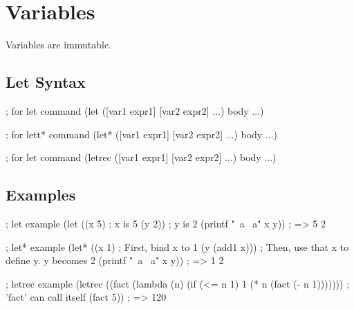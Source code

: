 \section{Variables}

Variables are immutable.

\subsection{Let Syntax}

\begin{racketcode}
; for let command
(let ([var1 expr1] [var2 expr2] ...) body ...)

; for lett* command
(let* ([var1 expr1] [var2 expr2] ...) body ...)

; for let command
(letrec ([var1 expr1] [var2 expr2] ...) body ...)
\end{racketcode}

\subsection{Examples}

\begin{racketcode}
; let example
(let ((x 5)      ; x is 5
      (y 2))     ; y is 2
  (printf "~a ~a\n" x y)) ; => 5 2

; let* example
(let* ((x 1)           ; First, bind x to 1
       (y (add1 x)))   ; Then, use that x to define y. y becomes 2
  (printf "~a ~a\n" x y)) ; => 1 2

; letrec example
(letrec ((fact (lambda (n)
                 (if (<= n 1)
                     1
                     (* n (fact (- n 1))))))) ; 'fact' can call itself
  (fact 5)) ; => 120
\end{racketcode}

